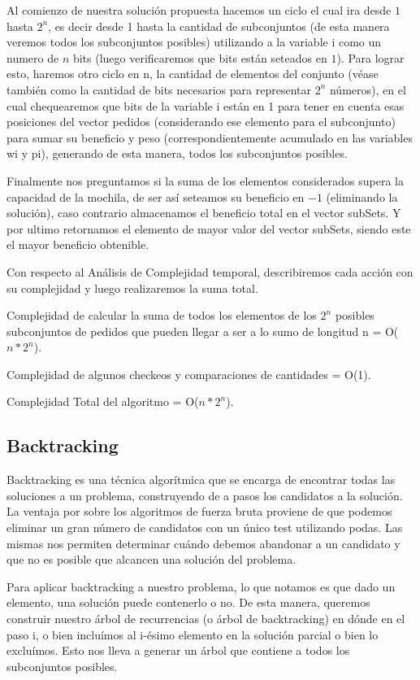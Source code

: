 Al comienzo de nuestra solución propuesta hacemos un ciclo el cual ira desde $1$ hasta $2^{n}$, es decir desde 1 hasta la cantidad de subconjuntos (de esta manera veremos todos los subconjuntos posibles) utilizando a la variable i como un numero de $n$ bits (luego verificaremos que bits están seteados en $1$). 
Para lograr esto, haremos otro ciclo en n, la cantidad de elementos del conjunto (véase también como la cantidad de bits necesarios para representar $2^{n}$ números), en el cual chequearemos que bits de la variable i están en 1 para tener en cuenta esas posiciones del vector pedidos (considerando ese elemento para el subconjunto) para sumar su beneficio y peso (correspondientemente acumulado en las variables wi y pi), generando de esta manera, todos los subconjuntos posibles. 


Finalmente nos preguntamos si la suma de los elementos considerados supera la capacidad de la mochila, de ser así seteamos su beneficio en $-1$ (eliminando la solución), caso contrario almacenamos el beneficio total en el vector subSets. Y por ultimo retornamos el elemento de mayor valor del vector subSets, siendo este el mayor beneficio obtenible.

Con respecto al Análisis de Complejidad temporal, describiremos cada acción con su complejidad y luego realizaremos la suma total.


Complejidad de calcular la suma de todos los elementos de los $2^{n}$ posibles subconjuntos de pedidos que pueden llegar a ser a lo sumo de longitud n = O($n*2^{n}$).


Complejidad de algunos checkeos y comparaciones de cantidades = O(1).


Complejidad Total del algoritmo = O($n*2^{n}$).

\subsection{Backtracking}

Backtracking es una técnica algorítmica que se encarga de encontrar todas las soluciones a un problema, construyendo de a pasos los candidatos a la solución. La ventaja por sobre los algoritmos de fuerza bruta proviene de que podemos eliminar un gran número de candidatos con un único test utilizando podas. Las mismas nos permiten determinar cuándo debemos abandonar a un candidato y que no es posible que alcancen una solución del problema.

Para aplicar backtracking a nuestro problema, lo que notamos es que dado un elemento, una solución puede contenerlo o no. De esta manera, queremos construir nuestro árbol de recurrencias (o árbol de backtracking) en dónde en el paso i, o bien incluímos al i-ésimo elemento en la solución parcial o bien lo excluímos. Esto nos lleva a generar un árbol que contiene a todos los subconjuntos posibles.

